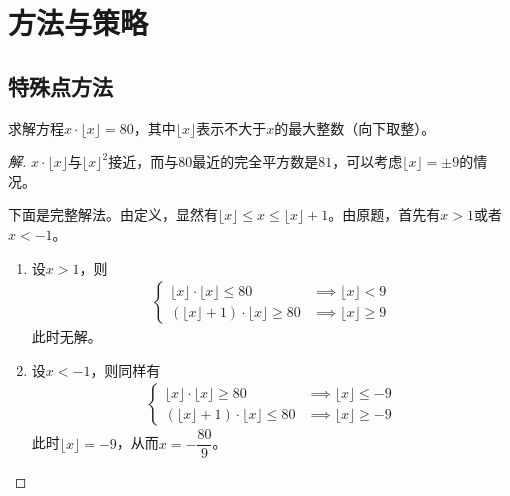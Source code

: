 
\chapter{方法与策略}
\label{chap:methods}

\section{特殊点方法}
\label{sec:special-point-method}

\begin{example}
  求解方程$x\cdot \lfloor x\rfloor=80$，其中$\lfloor x\rfloor$表示不大于$x$的最大整数（向下取整）。
\end{example}
\begin{proof}[解]
  $x\cdot \lfloor x\rfloor$与$\lfloor x\rfloor ^2$接近，而与$80$最近的完全平方数是$81$，可以考虑$\lfloor x\rfloor=\pm 9$的情况。

  下面是完整解法。由定义，显然有$\lfloor x\rfloor\le x \le \lfloor x\rfloor + 1$。由原题，首先有$x>1$或者$x<-1$。

  \begin{enumerate}
  \item 设$x>1$，则
    \begin{align*}
      \begin{cases}
        \lfloor x\rfloor \cdot \lfloor x\rfloor  \le 80 &\implies \lfloor x\rfloor < 9\\
        \left(\lfloor x\rfloor + 1\right)\cdot \lfloor x\rfloor \ge 80 &\implies \lfloor x\rfloor \ge 9
      \end{cases}
    \end{align*}
    此时无解。
  \item 设$x<-1$，则同样有
    \begin{align*}
      \begin{cases}
        \lfloor x\rfloor \cdot \lfloor x\rfloor  \ge 80 &\implies \lfloor x\rfloor \le -9\\
        \left(\lfloor x\rfloor + 1\right)\cdot \lfloor x\rfloor \le 80 &\implies \lfloor x\rfloor \ge -9
      \end{cases}
    \end{align*}
    此时$\lfloor x\rfloor=-9$，从而$x=-\dfrac{80}{9}$。\qedhere
  \end{enumerate}
\end{proof}


